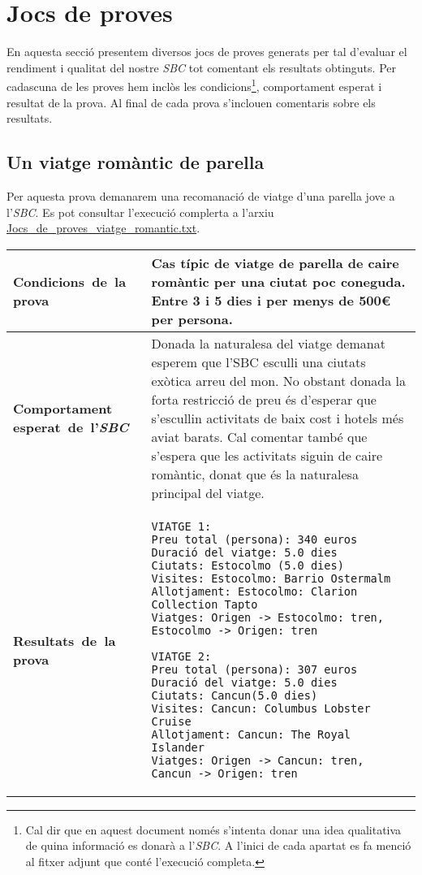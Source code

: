 \documentclass[11pt,a4paper]{article}
\begin{document}
\clearpage

\section{Jocs de proves}
En aquesta secció presentem diversos jocs de proves generats per tal d'evaluar el rendiment i qualitat del nostre \emph{SBC} tot comentant els resultats obtinguts. Per cadascuna de les proves hem inclòs les condicions\footnote{Cal dir que en aquest document només s'intenta donar una idea qualitativa de quina informació es donarà a l'\emph{SBC}. A l'inici de cada apartat es fa menció al fitxer adjunt que conté l'execució completa.}, comportament esperat i resultat de la prova. Al final de cada prova s'inclouen comentaris sobre els resultats.


\subsection{Un viatge romàntic de parella}

Per aquesta prova demanarem una recomanació de viatge d'una parella jove a l'\emph{SBC}. Es pot consultar l'execució complerta a l'arxiu \url{Jocs_de_proves_viatge_romantic.txt}.

\noindent
\begin{tabular}{|p{}|p{}|}
\hline
\textbf{\mbox{Condicions de la} \mbox{prova}} & Cas típic de viatge de parella de caire romàntic per una ciutat poc coneguda. Entre 3 i 5 dies i per menys de 500\euro{} per persona.\\
\hline
\textbf{Comportament \mbox{esperat de l'\emph{SBC}}} & Donada la naturalesa del viatge demanat esperem que l'SBC esculli una ciutats exòtica arreu del mon. No obstant donada la forta restricció de preu és d'esperar que s'escullin activitats de baix cost i hotels més aviat barats. Cal comentar també que s'espera que les activitats siguin de caire romàntic, donat que és la naturalesa principal del viatge. \\
\hline
\textbf{\mbox{Resultats de la} \mbox{prova}} & \begin{verbatim}VIATGE 1:
Preu total (persona): 340 euros
Duració del viatge: 5.0 dies
Ciutats: Estocolmo (5.0 dies)
Visites: Estocolmo: Barrio Ostermalm
Allotjament: Estocolmo: Clarion Collection Tapto
Viatges: Origen -> Estocolmo: tren, Estocolmo -> Origen: tren

VIATGE 2:
Preu total (persona): 307 euros
Duració del viatge: 5.0 dies
Ciutats: Cancun(5.0 dies)
Visites: Cancun: Columbus Lobster Cruise
Allotjament: Cancun: The Royal Islander
Viatges: Origen -> Cancun: tren, Cancun -> Origen: tren

\end{verbatim} \\
\hline
\end{tabular}
\medskip
\end{document}
